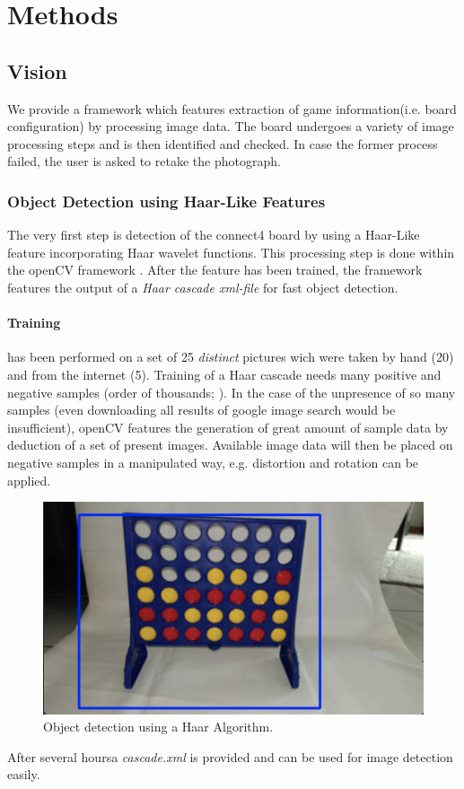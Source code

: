 \documentclass[10pt,twocolumn,letterpaper]{article}
\begin{document}
\section{Methods}

\subsection{Vision}
We provide a framework which features extraction of game information(i.e. board configuration) by processing image data.
The board undergoes a variety of image processing steps and is then identified and checked.
In case the former process failed, the user is asked to retake the photograph.

\subsubsection{Object Detection using Haar-Like Features}
The very first step is detection of the connect4 board by using a Haar-Like feature incorporating Haar wavelet functions.
This processing step is done within the openCV framework \parencite{openCV}.
After the feature has been trained, the framework features the output of a \textit{Haar cascade xml-file} for fast object detection.

\paragraph{Training} has been performed on a set of 25 \textit{distinct} pictures wich were taken by hand (20) and from the internet (5).
Training of a Haar cascade needs many positive and negative samples (order of thousands;  \cite{kuranov}).
In the case of the unpresence of so many samples (even downloading all results of google image search would be insufficient), openCV features the generation of great amount of sample data by deduction of a set of present images.
Available image data will then be placed on negative samples in a manipulated way, e.g. distortion and rotation can be applied.
\begin{figure}[bh]
  \centering
  \includegraphics[width = .3\textwidth]{figures/detection.png}
  \caption{Object detection using a Haar Algorithm.}
  \label{fig:haarDetection}
\end{figure}
After several hoursa \textit{cascade.xml} is provided and can be used for image detection easily.
\end{document}
